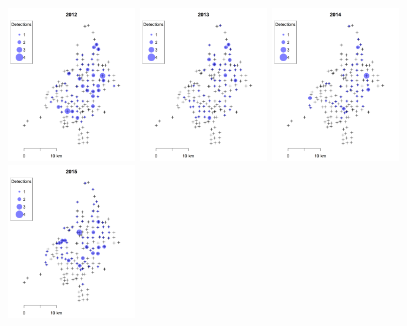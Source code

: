 \documentclass[12pt]{article}
\begin{document}
\begin{figure}[h!]
  \setlength{\fboxsep}{0pt}
  \centering
  {\includegraphics[width=0.3\textwidth]{figs/dets2012}} \hfill
  {\includegraphics[width=0.3\textwidth]{figs/dets2013}} \hfill
  {\includegraphics[width=0.3\textwidth]{figs/dets2014}} \\
  {\includegraphics[width=0.3\textwidth]{figs/dets2015}} \hspace{12pt}

\end{figure}
\end{document}
